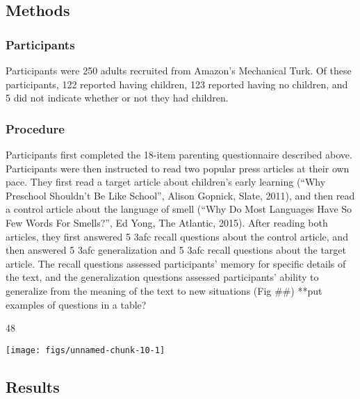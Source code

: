 \documentclass[10pt, letterpaper]{article}
\newenvironment{CodeChunk}{}{}
\begin{document}
\subsection{Methods}\label{methods}

\subsubsection{Participants}\label{participants}

Participants were 250 adults recruited from Amazon's Mechanical Turk. Of
these participants, 122 reported having children, 123 reported having no
children, and 5 did not indicate whether or not they had children.

\subsubsection{Procedure}\label{procedure}

Participants first completed the 18-item parenting questionnaire
described above. Participants were then instructed to read two popular
press articles at their own pace. They first read a target article about
children's early learning (``Why Preschool Shouldn't Be Like School'',
Alison Gopnick, Slate, 2011), and then read a control article about the
language of smell (``Why Do Most Languages Have So Few Words For
Smells?'', Ed Yong, The Atlantic, 2015). After reading both articles,
they first answered 5 3afc recall questions about the control article,
and then answered 5 3afc generalization and 5 3afc recall questions
about the target article. The recall questions assessed participants'
memory for specific details of the text, and the generalization
questions assessed participants' ability to generalize from the meaning
of the text to new situations (Fig \#\#) **put examples of questions in
a table?

\begin{CodeChunk}
\begin{CodeOutput}
[1] 48
\end{CodeOutput}
\end{CodeChunk}

\begin{CodeChunk}

\texttt{[image: figs/unnamed-chunk-10-1]} \end{CodeChunk}

\subsection{Results}\label{results}
\end{document}
